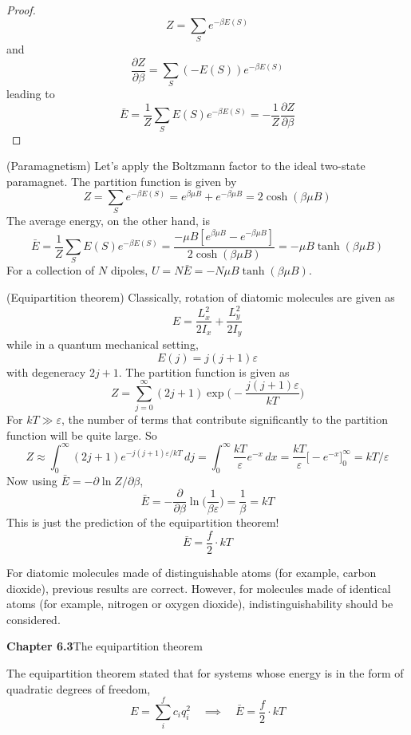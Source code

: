 \vspace{2ex}
\begin{proof}
\[Z=\sum _{S}e^{-\beta E(S)}\]
and 
\[\dfrac{\partial Z}{\partial \beta }=\sum _{S}(-E(S))e^{-\beta E(S)} \]
leading to
\[\bar{E}=\dfrac{1}{Z}\sum _{S}E(S)e^{-\beta E(S)}=-\dfrac{1}{Z}\dfrac{\partial Z}{\partial \beta } \]
\end{proof}
\vspace{2ex}
\begin{ex}
(Paramagnetism) Let's apply the Boltzmann factor to the ideal two-state paramagnet. The partition function is given by 
\[Z=\sum _{S}e^{-\beta E(S)}=e^{\beta \mu B}+e^{-\beta \mu B}=2\cosh (\beta \mu B)\]
The average energy, on the other hand, is
\[\bar{E}=\dfrac{1}{Z}\sum _{S}E(S)e^{-\beta E(S)}=\dfrac{-\mu B[e^{\beta \mu B}-e^{-\beta \mu B}]}{2\cosh (\beta \mu B)}=-\mu B\tanh (\beta \mu B)\]
For a collection of $N$ dipoles, $U=N\bar{E}=-N\mu B\tanh (\beta \mu B)$.
\end{ex}
\vspace{2ex}
\begin{ex}
(Equipartition theorem) Classically, rotation of diatomic molecules are given as
\[E=\dfrac{L_{x}^2}{2I_{x}}+\dfrac{L_{y}^2}{2I_{y}}\]
while in a quantum mechanical setting,
\[E(j)=j(j+1)\varepsilon \]
with degeneracy $2j+1$. The partition function is given as
\[Z=\sum ^{\infty }_{j=0}(2j+1)\exp \Big(-\dfrac{j(j+1)\varepsilon }{kT}\Big)\]
For $kT\gg \varepsilon $, the number of terms that contribute significantly to the partition function will be quite large. So
\[Z\approx \int ^{\infty }_{0}(2j+1)e^{-j(j+1)\varepsilon /kT}\,dj=\int^{\infty }_{0}\dfrac{kT}{\varepsilon }e^{-x}\,dx=\dfrac{kT}{\varepsilon }\Big[-e^{-x}\Big]^{\infty }_{0}=kT/\varepsilon \]
Now using $\bar{E}=-\partial \ln Z/\partial \beta $,
\[\bar{E}=-\dfrac{\partial }{\partial \beta }\ln \Big(\dfrac{1}{\beta \varepsilon }\Big)=\dfrac{1}{\beta }=kT \]
This is just the prediction of the equipartition theorem! 
\[\bar{E}=\dfrac{f}{2}\cdot kT\]
\end{ex}
\vspace{2ex}
\begin{rmk}
For diatomic molecules made of distinguishable atoms (for example, carbon dioxide), previous results are correct. However, for molecules made of identical atoms (for example, nitrogen or oxygen dioxide), indistinguishability should be considered.
\end{rmk}
\vspace{2ex}
{\bf Chapter 6.3}\hspace{2ex}The equipartition theorem
\newline
\begin{recall}
The equipartition theorem stated that for systems whose energy is in the form of quadratic degrees of freedom,
\[E=\sum_{i}^{f}c_{i}q_{i}^2\quad\implies \quad \bar{E}=\dfrac{f}{2}\cdot kT\]

\end{recall}
\vspace{2ex}

